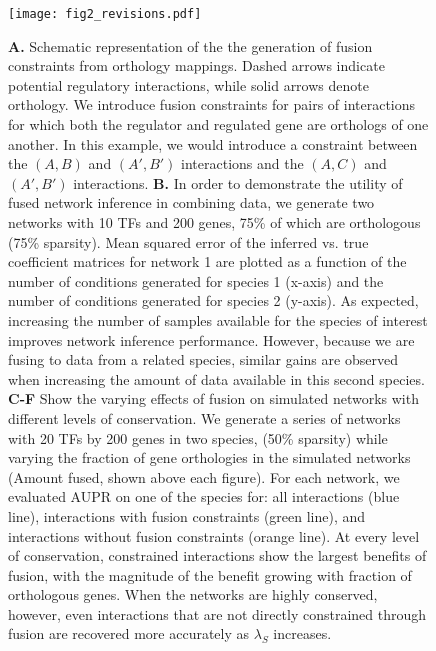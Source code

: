 \documentclass[11pt]{article}
\begin{document}
\begin{figure}
\begin{center}
  \texttt{[image: fig2\_revisions.pdf]}
  \caption{\label{fusion} \textbf{A.} Schematic representation of the the generation of fusion constraints from orthology mappings. Dashed arrows indicate potential regulatory interactions, while solid arrows denote orthology. We introduce fusion constraints for pairs of interactions for which both the regulator and regulated gene are orthologs of one another.   In this example, we would introduce a constraint between the $(A, B)$ and $(A', B')$ interactions and the $(A, C)$ and $(A', B')$ interactions. \textbf{B.} 
  In order to demonstrate the utility of fused network inference in combining data, we generate two networks with 10 TFs and 200 genes, 75\% of which are orthologous (75\% sparsity). Mean squared error of the inferred vs. true coefficient matrices for network 1 are plotted as a function of the number of conditions generated for species 1 (x-axis) and the number of conditions generated for species 2 (y-axis). 
  As expected, increasing the number of samples available for the species of interest improves network inference performance. 
  However, because we are fusing to data from a related species, similar gains are observed when increasing the amount of data available in this second species. 
  \textbf{C-F} Show the varying effects of fusion on simulated networks with different levels of conservation. We generate a series of networks with 20 TFs by 200 genes in two species, (50\% sparsity) while varying the fraction of gene orthologies in the simulated networks (Amount fused, shown above each figure). For each network, we evaluated AUPR on one of the species for: all interactions (blue line), interactions with fusion constraints (green line), and interactions without fusion constraints (orange line). At every level of conservation, constrained interactions show the largest benefits of fusion, with the magnitude of the benefit growing with fraction of orthologous genes. 
  When the networks are highly conserved, however, even interactions that are not directly constrained through fusion are recovered more accurately as $\lambda_S$ increases.}
\end{center}
\end{figure}
\pagebreak
\end{document}
